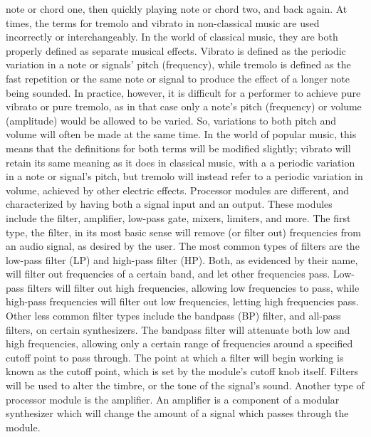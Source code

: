 note or chord one, then quickly playing note or chord two, and back again. At times, the terms for tremolo and vibrato in non-classical music are used incorrectly or interchangeably. In the world of classical music, they are both properly defined as separate musical effects. Vibrato is defined as the periodic variation in a note or signals' pitch (frequency), while tremolo is defined as the fast repetition or the same note or signal to produce the effect of a longer note being sounded. In practice, however, it is difficult for a performer to achieve pure vibrato or pure tremolo, as in that case only a note's pitch (frequency) or volume (amplitude) would be allowed to be varied. So, variations to both pitch and volume will often be made at the same time. In the world of popular music, this means that the definitions for both terms will be modified slightly; vibrato will retain its same meaning as it does in classical music, with a a periodic variation in a note or signal's pitch, but tremolo will instead refer to a periodic variation in volume, achieved by other electric effects.
Processor modules are different, and characterized by having both a signal input and an output. These modules include the filter, amplifier, low-pass gate, mixers, limiters, and more. The first type, the filter, in its most basic sense will remove (or filter out) frequencies from an audio signal, as desired by the user. The most common types of filters are the low-pass filter (LP) and high-pass filter (HP). Both, as evidenced by their name, will filter out frequencies of a certain band, and let other frequencies pass. Low-pass filters will filter out high frequencies, allowing low frequencies to pass, while high-pass frequencies will filter out low frequencies, letting high frequencies pass\cite{Winer_2018}. Other less common filter types include the bandpass (BP) filter, and all-pass filters, on certain synthesizers. The bandpass filter will attenuate both low and high frequencies, allowing only a certain range of frequencies around a specified cutoff point to pass through. The point at which a filter will begin working is known as the cutoff point, which is set by the module's cutoff knob itself. Filters will be used to alter the timbre, or the tone of the signal's sound. Another type of processor module is the amplifier. An amplifier is a component of a modular synthesizer which will change the amount of a signal which passes through the module. 
